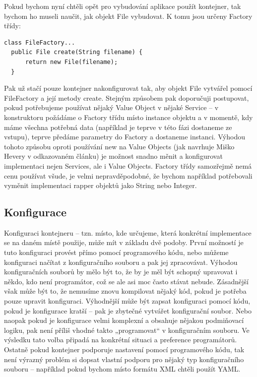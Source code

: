 \documentclass[a4paper,conference]{IEEEtran}
\begin{document}
Pokud bychom nyní chtěli opět pro vybudování aplikace použít kontejner, tak bychom ho museli naučit, jak objekt File vybudovat. K tomu jsou určeny Factory třídy:

\lstset{language=Java, caption=Naplnění proměnné finder s využitím interface, label=listing:Java}
\begin{lstlisting}
class FileFactory...
  public File create(String filename) {
      return new File(filename);
  }
\end{lstlisting}

Pak už stačí pouze kontejner nakonfigurovat tak, aby objekt File vytvářel pomocí FileFactory a její metody create. Stejným způsobem pak doporučuji postupovat, pokud potřebujeme používat nějaký Value Object v nějaké Service – v konstruktoru požádáme o Factory třídu místo instance objektu a v momentě, kdy máme všechna potřebná data (například je teprve v této fázi dostaneme ze vstupu), teprve předáme parametry do Factory a dostaneme instanci. Výhodou tohoto způsobu oproti používání new na Value Objects (jak navrhuje Miško Hevery v odkazovaném článku) je možnost snadno měnit a konfigurovat implementaci nejen Services, ale i Value Objects. Factory třídy samozřejmě nemá cenu používat všude, je velmi nepravděpodobné, že bychom například potřebovali vyměnit implementaci rapper objektů jako String nebo Integer.

\subsection{Konfigurace}

Konfiguraci kontejneru – tzn. místo, kde určujeme, která konkrétní implementace se na daném místě použije, může mít v základu dvě podoby. První možností je tuto konfiguraci provést přímo pomocí programového kódu, nebo můžeme konfiguraci načítat z konfiguračního souboru a pak jej zpracovávat.
Výhodou konfiguračních souborů by mělo být to, že by je měl být schopný upravovat i někdo, kdo není programátor, což se ale asi moc často stávat nebude. Zásadnější však může být to, že nemusíme znovu kompilovat nějaký kód, pokud je potřeba pouze upravit konfiguraci.
Výhodnější může být zapsat konfiguraci pomocí kódu, pokud je konfigurace kratší – pak je zbytečné vytvářet konfigurační soubor. Nebo naopak pokud je konfigurace velmi komplexní a obsahuje nějakou podmiňovací logiku, pak není příliš vhodné takto „programovat“ v konfiguračním souboru.
Ve výsledku tato volba připadá na konkrétní situaci a preference programátorů. Ostatně pokud kontejner podporuje nastavení pomocí programového kódu, tak není výrazný problém si dopsat vlastní podporu pro nějaký typ konfiguračního souboru – například pokud bychom místo formátu XML chtěli použít YAML.
\end{document}
